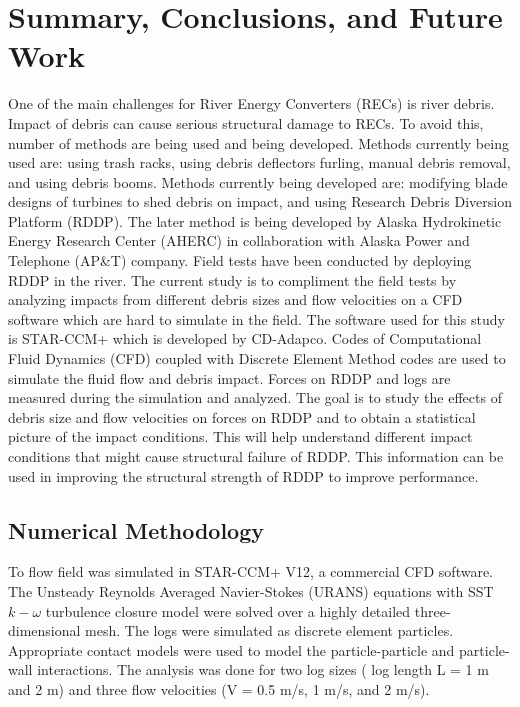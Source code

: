 
\chapter{Summary, Conclusions, and Future Work} %

\label{Chapter5} %

One of the main challenges for River Energy Converters (RECs) is river debris. Impact of debris can cause serious structural damage to RECs. To avoid this, number of methods are being used and being developed. Methods currently being used are: using trash racks, using debris deflectors furling, manual debris removal, and using debris booms. Methods currently being developed are: modifying blade designs of turbines to shed debris on impact, and using Research Debris Diversion Platform (RDDP). The later method is being developed by Alaska Hydrokinetic Energy Research Center (AHERC) in collaboration with Alaska Power and Telephone (AP\&T) company. Field tests have been conducted by deploying RDDP in the river. The current study is to compliment the field tests by analyzing impacts from different debris sizes and flow velocities on a CFD software which are hard to simulate in the field. The software used for this study is STAR-CCM+ which is developed by CD-Adapco. Codes of Computational Fluid Dynamics (CFD) coupled with Discrete Element Method codes are used to simulate the fluid flow and debris impact. Forces on RDDP and logs are measured during the simulation and analyzed. The goal is to study the effects of debris size and flow velocities on forces on RDDP and to obtain a statistical picture of the impact conditions. This will help understand different impact conditions that might cause structural failure of RDDP. This information can be used in improving the structural strength of RDDP to improve performance. 

\section{Numerical Methodology}
To flow field was simulated in STAR-CCM+ V12, a commercial CFD software. The Unsteady Reynolds Averaged Navier-Stokes (URANS) equations with SST $k-\omega$ turbulence closure model were solved over a highly detailed three-dimensional mesh. The logs were simulated as discrete element particles. Appropriate contact models were used to model the particle-particle and particle-wall interactions. The analysis was done for two log sizes ( log length L = 1 m and 2 m) and three flow velocities (V = 0.5 m/s, 1 m/s, and 2 m/s). 

